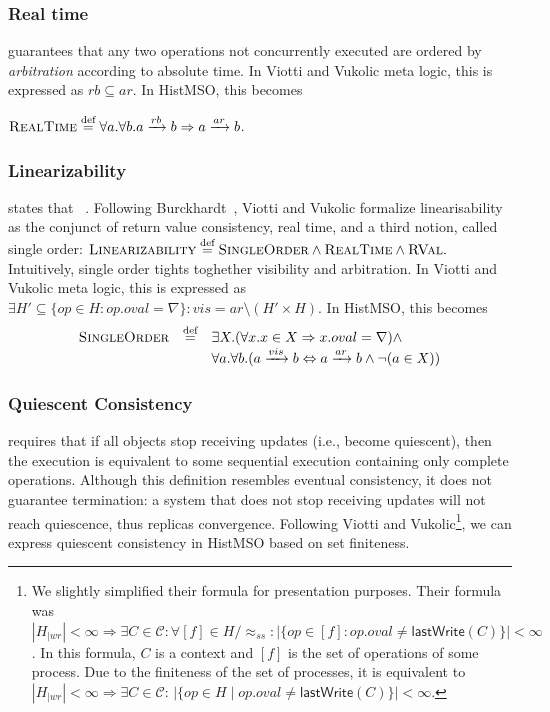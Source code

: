 \subsubsection{Real time} guarantees that any two operations not concurrently executed are ordered by \textsl{arbitration} according to absolute time. In Viotti and Vukolic meta logic, this is expressed as $rb\subseteq ar$. In HistMSO, this becomes

$\textsc{RealTime} \stackrel{\text{def}}{=} \forall a.\forall b. a\xrightarrow{rb}b \Rightarrow a\xrightarrow{ar}b $.


\subsubsection{Linearizability} states that ~\cite{HerlihyW90}. Following Burckhardt~\cite{PrinciplesOfEventualConsistency}, Viotti and Vukolic formalize linearisability as the conjunct of return value consistency, real time, and a third notion, called single order:
$
 \textsc{Linearizability} \stackrel{\text{def}}{=} \textsc{SingleOrder}\land\textsc{RealTime}\land\textsc{RVal}.
$
Intuitively, single order tights toghether visibility and arbitration. In Viotti and Vukolic meta logic, this is expressed as
$
\exists H ' \subseteq \{ op \in H : op.oval= \nabla \} : vis = ar\setminus (H'\times H).
$
In HistMSO, this becomes
$$
\begin{array}{rcl}
\textsc{SingleOrder} & \stackrel{\text{def}}{=} & \exists X.( \forall x.x\in X\Rightarrow x.oval=\nabla )\land\\ 
&& \forall a.\forall b.(a\xrightarrow{vis}b \Leftrightarrow a\xrightarrow{ar}b\land\neg(a\in X))
\end{array}
$$  

\subsubsection{Quiescent Consistency} requires that if all objects stop receiving
updates (i.e., become quiescent), then the execution is equivalent to some sequential execution containing only complete operations. Although this definition resembles eventual consistency, it does not guarantee termination: a system that does not stop receiving updates will not reach quiescence, thus replicas convergence. Following Viotti and Vukolic\footnote{We slightly simplified their formula for presentation purposes. Their formula was $|H_{|wr}|<\infty \Rightarrow \exists C\in\mathcal C :\forall [f]\in H/{\approx_{ss}}:|\{op\in[f]:op.oval\neq\mathsf{lastWrite}(C)\}|<\infty
$. In this formula, $C$ is a context and $[f]$ is the set of operations of some process. Due to the finiteness of the set of processes, it is equivalent to $|H_{|wr}|<\infty \Rightarrow \exists C\in\mathcal C:\, |\{op\in H \mid op.oval\neq \mathsf{lastWrite}(C)\}|<\infty
$.}, we can express quiescent consistency in HistMSO based on set finiteness.


